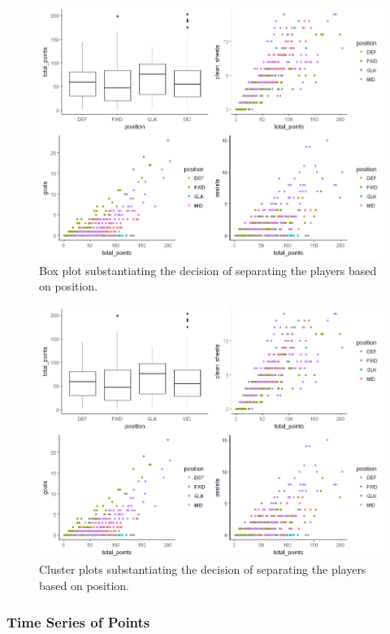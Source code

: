 \begin{figure}[H]
    \centering
    \includegraphics[scale=0.55]{fig/chapter_6/cluster_plots.png}
    \caption{Box plot substantiating the decision of separating the players based on position.}
\label{fig:cluster_plots}    
\end{figure}


\begin{figure}[H]
    \centering
    \includegraphics[scale=0.55]{fig/chapter_6/cluster_plots.png}
    \caption{Cluster plots substantiating the decision of separating the players based on position.}
\label{fig:cluster_plots}    
\end{figure}


\subsubsection{Time Series of Points}

